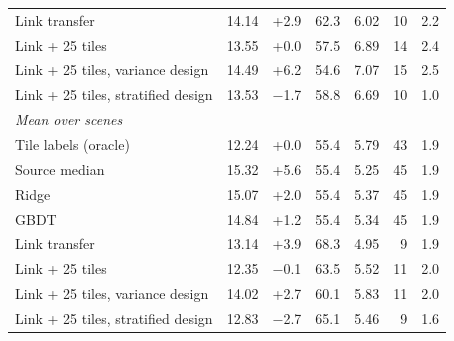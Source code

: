 \begin{tabular}{lrrrrrr}
Link transfer & 14.14 & +2.9 & 62.3 & 6.02 & 10 & 2.2 \\
Link + 25 tiles & 13.55 & +0.0 & 57.5 & 6.89 & 14 & 2.4 \\
Link + 25 tiles, variance design & 14.49 & +6.2 & 54.6 & 7.07 & 15 & 2.5 \\
Link + 25 tiles, stratified design & 13.53 & \ensuremath{-}1.7 & 58.8 & 6.69 & 10 & 1.0 \\
\midrule
\multicolumn{7}{l}{\emph{Mean over scenes}} \\
Tile labels (oracle) & 12.24 & +0.0 & 55.4 & 5.79 & 43 & 1.9 \\
Source median & 15.32 & +5.6 & 55.4 & 5.25 & 45 & 1.9 \\
Ridge & 15.07 & +2.0 & 55.4 & 5.37 & 45 & 1.9 \\
GBDT & 14.84 & +1.2 & 55.4 & 5.34 & 45 & 1.9 \\
Link transfer & 13.14 & +3.9 & 68.3 & 4.95 & 9 & 1.9 \\
Link + 25 tiles & 12.35 & \ensuremath{-}0.1 & 63.5 & 5.52 & 11 & 2.0 \\
Link + 25 tiles, variance design & 14.02 & +2.7 & 60.1 & 5.83 & 11 & 2.0 \\
Link + 25 tiles, stratified design & 12.83 & \ensuremath{-}2.7 & 65.1 & 5.46 & 9 & 1.6 \\
\bottomrule
\end{tabular}
